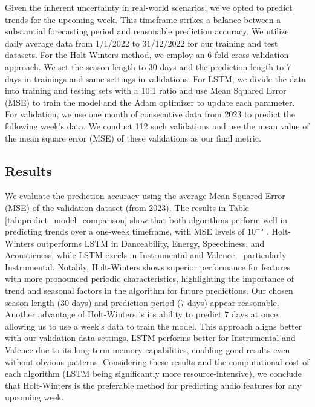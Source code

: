 \documentclass{article}
\begin{document}
Given the inherent uncertainty in real-world scenarios, we've opted to predict trends for the upcoming week. This timeframe strikes a balance between a substantial forecasting period and reasonable prediction accuracy. We utilize daily average data from 1/1/2022 to 31/12/2022 for our training and test datasets. For the Holt-Winters method, we employ an 6-fold cross-validation approach. We set the season length to 30 days and the prediction length to 7 days in trainings and same settings in validations. For LSTM, we divide the data into training and testing sets with a 10:1 ratio and use Mean Squared Error (MSE) to train the model and the Adam optimizer to update each parameter. For validation, we use one month of consecutive data from 2023 to predict the following week's data. We conduct 112 such validations and use the mean value of the mean square error (MSE) of these validations as our final metric.

\subsection{Results}
We evaluate the prediction accuracy using the average Mean Squared Error (MSE) of the validation dataset (from 2023). The results in Table \ref {tab:predict_model_comparison} show that both algorithms perform well in predicting trends over a one-week timeframe, with MSE levels of $10^{-5}$ . Holt-Winters outperforms LSTM in Danceability, Energy, Speechiness, and Acousticness, while LSTM excels in Instrumental and Valence—particularly Instrumental. Notably, Holt-Winters shows superior performance for features with more pronounced periodic characteristics, highlighting the importance of trend and seasonal factors in the algorithm for future predictions. Our chosen season length (30 days) and prediction period (7 days) appear reasonable. Another advantage of Holt-Winters is its ability to predict 7 days at once, allowing us to use a week's data to train the model. This approach aligns better with our validation data settings. LSTM performs better for Instrumental and Valence due to its long-term memory capabilities, enabling good results even without obvious patterns. Considering these results and the computational cost of each algorithm (LSTM being significantly more resource-intensive), we conclude that Holt-Winters is the preferable method for predicting audio features for any upcoming week.
\end{document}
